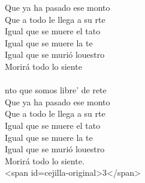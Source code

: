 \begin{cancion}
	Que ya ha pasado ese monto\\
	Que a todo le llega a su rte\\
	Igual que se muere el tato\\
	Igual que se muere la te\\
	Igual que se murió louestro\\
	Morirá todo lo siente\\
	\jump\\
	nto que somos libre' de rete\\
	Que ya ha pasado ese monto\\
	Que a todo le llega a su rte\\
	Igual que se muere el tato\\
	Igual que se muere la te\\
	Igual que se murió louestro\\
	Morirá todo lo siente.\\
<span id=cejilla-original>3</span>\\
\end{cancion}%
